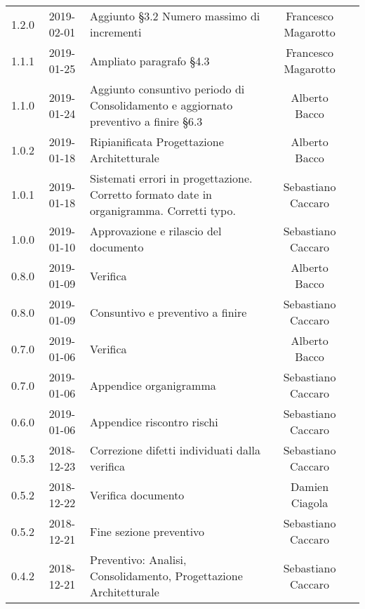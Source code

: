 {\begin{longtable}{ c c  C{4cm}  c  c }
		1.2.0 & 2019-02-01 & Aggiunto §3.2 Numero massimo di incrementi & Francesco Magarotto & \reda{}\\

		1.1.1 & 2019-01-25 & Ampliato paragrafo §4.3 & Francesco Magarotto & \reda{}\\

		1.1.0 & 2019-01-24 & Aggiunto consuntivo periodo di Consolidamento  e aggiornato preventivo a finire §6.3 & Alberto Bacco & \reda{}\\

		1.0.2 & 2019-01-18 & Ripianificata Progettazione Architetturale & Alberto Bacco & \Res{} \\

		1.0.1 & 2019-01-18 & Sistemati errori in progettazione. Corretto formato date in organigramma. Corretti typo. & Sebastiano Caccaro & \reda{}\\

		1.0.0 & 2019-01-10 & Approvazione e rilascio del documento & Sebastiano Caccaro & \Res{}\\

		0.8.0 & 2019-01-09 & Verifica & Alberto Bacco & \ver{}\\
		
		0.8.0 & 2019-01-09 & Consuntivo e preventivo a finire & Sebastiano Caccaro & \reda{}\\			
		
		0.7.0 & 2019-01-06 & Verifica & Alberto Bacco & \ver{}\\		
		
		0.7.0 & 2019-01-06 & Appendice organigramma & Sebastiano Caccaro & \reda{}\\		
		
		0.6.0 & 2019-01-06 & Appendice riscontro rischi & Sebastiano Caccaro & \reda{}\\
					
		0.5.3 & 2018-12-23 & Correzione difetti individuati dalla verifica & Sebastiano Caccaro & \reda{}\\		
		
		0.5.2 & 2018-12-22 & Verifica documento & Damien Ciagola & \ver{}\\
		
		0.5.2 & 2018-12-21 & Fine sezione preventivo & Sebastiano Caccaro & \reda{}\\
		
		0.4.2 & 2018-12-21 & Preventivo: Analisi, Consolidamento, Progettazione Architetturale & Sebastiano Caccaro & \reda{}\\
		

\end{longtable}}

